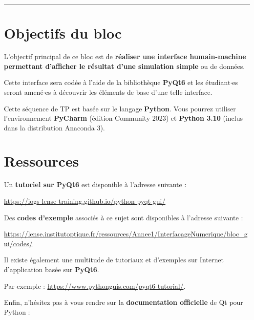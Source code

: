 \documentclass[a4paper,11pt,titlepage]{article} %
\begin{document}
\noindent \rule{\linewidth}{1pt}

\medskip



\section{Objectifs du bloc}

L'objectif principal de ce bloc est de \textbf{réaliser une interface humain-machine permettant d'afficher le résultat d'une simulation simple} ou de données.

Cette interface sera codée à l'aide de la bibliothèque \textbf{PyQt6} et les étudiant$\cdot$es seront amené$\cdot$es à découvrir les éléments de base d'une telle interface.

Cette séquence de TP est basée sur le langage \textbf{Python}. Vous pourrez utiliser l'environnement \textbf{PyCharm} (édition Community 2023) et \textbf{Python 3.10} (inclus dans la distribution Anaconda 3).


\section{Ressources}

Un \textbf{tutoriel sur PyQt6} est disponible à l'adresse suivante :

\href{https://iogs-lense-training.github.io/python-pyqt-gui/}{https://iogs-lense-training.github.io/python-pyqt-gui/}

Des \textbf{codes d'exemple} associés à ce sujet sont disponibles à l'adresse suivante : 

\href{https://lense.institutoptique.fr/ressources/Annee1/InterfacageNumerique/bloc_gui/codes/}{https://lense.institutoptique.fr/ressources/Annee1/InterfacageNumerique/bloc\_gui/codes/}

\medskip

Il existe également une multitude de tutoriaux et d'exemples sur Internet d'application basée sur \textbf{PyQt6}. 

Par exemple :  \href{https://www.pythonguis.com/pyqt6-tutorial/}{https://www.pythonguis.com/pyqt6-tutorial/}.

\medskip

Enfin, n'hésitez pas à vous rendre sur la \textbf{documentation officielle} de Qt pour Python : 
\end{document}
